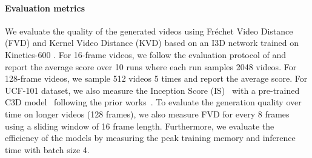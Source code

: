 \documentclass[10pt,twocolumn,letterpaper]{article}
\newcommand{\cutparagraphup}{\vspace*{-0.1in}}
\begin{document}
\cutparagraphup
\paragraph{Evaluation metrics}
We evaluate the quality of the generated videos using Fréchet Video Distance (FVD) \cite{FVD} and Kernel Video Distance (KVD) \cite{FVD} based on an I3D network trained on Kinetics-600 \cite{kinetics}. 
For 16-frame videos, we follow the evaluation protocol of \cite{TGANv2} and report the average score over 10 runs where each run samples 2048 videos.
For 128-frame videos, we sample 512 videos 5 times and report the average score.
For UCF-101 dataset, we also measure the Inception Score (IS)~\cite{IS} with a pre-trained C3D model~\cite{c3d} following the prior works~\cite{TATS, CCVS, VGAN}. 
To evaluate the generation quality over time on longer videos (128 frames), we also measure FVD for every 8 frames using a sliding window of 16 frame length.
Furthermore, we evaluate the efficiency of the models by measuring the peak training memory and inference time with batch size 4.
\end{document}

